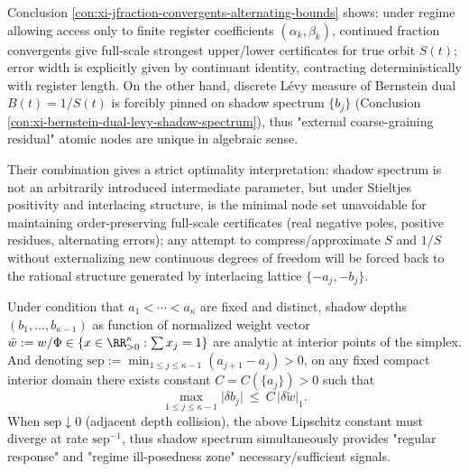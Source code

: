 \begin{remark}\label{rem:xi-shadow-spectrum-optimal-compression-nodes}
Conclusion \ref{con:xi-jfraction-convergents-alternating-bounds} shows: under regime allowing access only to finite register coefficients \((\alpha_k,\beta_k)\), continued fraction convergents give full-scale strongest upper/lower certificates for true orbit \(S(t)\); error width is explicitly given by continuant identity, contracting deterministically with register length.
On the other hand, discrete Lévy measure of Bernstein dual \(B(t)=1/S(t)\) is forcibly pinned on shadow spectrum \(\{b_j\}\) (Conclusion \ref{con:xi-bernstein-dual-levy-shadow-spectrum}), thus "external coarse-graining residual" atomic nodes are unique in algebraic sense.
\par
Their combination gives a strict optimality interpretation: shadow spectrum is not an arbitrarily introduced intermediate parameter, but under Stieltjes positivity and interlacing structure, is the minimal node set unavoidable for maintaining order-preserving full-scale certificates (real negative poles, positive residues, alternating errors); any attempt to compress/approximate \(S\) and \(1/S\) without externalizing new continuous degrees of freedom will be forced back to the rational structure generated by interlacing lattice \(\{-a_j,-b_j\}\).
\end{remark}

\begin{proposition}\label{con:xi-shadow-spectrum-stability}
Under condition that \(a_1<\cdots<a_\kappa\) are fixed and distinct, shadow depths \((b_1,\dots,b_{\kappa-1})\) as function of normalized weight vector
\(
\tilde w:=w/\Phi\in\{x\in\RR_{>0}^\kappa:\sum x_j=1\}
\)
are analytic at interior points of the simplex.
And denoting
\(
\mathrm{sep}:=\min_{1\le j\le \kappa-1}(a_{j+1}-a_j)>0
\),
on any fixed compact interior domain there exists constant \(C=C(\{a_j\})>0\) such that
\[
\max_{1\le j\le \kappa-1}\bigl|\delta b_j\bigr|
\ \le\ C\,\bigl|\delta \tilde w\bigr|_1.
\]
When \(\mathrm{sep}\downarrow 0\) (adjacent depth collision), the above Lipschitz constant must diverge at rate \(\mathrm{sep}^{-1}\), thus shadow spectrum simultaneously provides "regular response" and "regime ill-posedness zone" necessary/sufficient signals.
\end{proposition}

